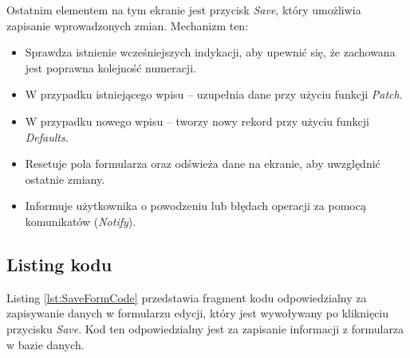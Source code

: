 Ostatnim elementem na tym ekranie jest przycisk \emph{Save}, który umożliwia zapisanie wprowadzonych zmian. Mechanizm ten:

\begin{itemize}
    \item Sprawdza istnienie wcześniejszych indykacji, aby upewnić się, że zachowana jest poprawna kolejność numeracji.
    \item W przypadku istniejącego wpisu -- uzupełnia dane przy użyciu funkcji \emph{Patch}.
    \item W przypadku nowego wpisu -- tworzy nowy rekord przy użyciu funkcji \emph{Defaults}.
    \item Resetuje pola formularza oraz odświeża dane na ekranie, aby uwzględnić ostatnie zmiany.
    \item Informuje użytkownika o powodzeniu lub błędach operacji za pomocą komunikatów (\emph{Notify}).
\end{itemize}

\subsection{Listing kodu}

Listing \ref{lst:SaveFormCode} przedstawia fragment kodu odpowiedzialny za zapisywanie danych w formularzu edycji, który jest wywoływany po kliknięciu przycisku \emph{Save}. Kod ten odpowiedzialny jest za zapisanie informacji z formularza w bazie danych.

